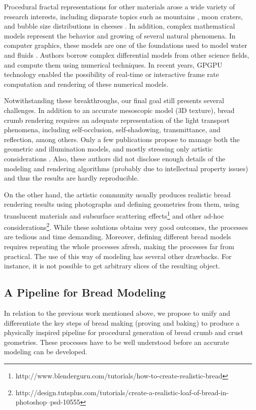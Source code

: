 Procedural fractal representations for other materials arose a wide variety of research interests, including disparate topics such as mountains \cite{Prusinkiewicz1993}, moon craters, and bubble size distributions in cheeses \cite{Mandelbrot1982}. 
In addition, complex mathematical models represent the behavior and growing of several natural phenomena. 
In computer graphics, these models are one of the foundations used to model water and fluids \cite{Stam1999,Fedkiw2001}. 
Authors borrow complex differential models from other science fields, and compute them using numerical techniques. 
In recent years, GPGPU technology \cite{Owens2007} enabled the possibility of real-time or interactive frame rate computation and rendering of these numerical models.

Notwithstanding these breakthroughs, our final goal still presents several challenges. 
In addition to an accurate mesoscopic model (3D texture), bread crumb rendering requires an adequate representation of the light transport phenomena, including self-occlusion, self-shadowing, transmittance, and reflection, among others.
Only a few publications propose to manage both the geometric and illumination models, and mostly stressing only artistic considerations \cite{Xenakis2007}.  Also, these authors did not disclose enough details of the modeling and rendering algorithms (probably due to intellectual property issues) and thus the results are hardly reproducible.

On the other hand, the artistic community usually produces realistic bread rendering results using photographs and defining geometries from them, using translucent materials and subsurface scattering effects\footnote{http://www.blenderguru.com/tutorials/how-to-create-realistic-bread} and other ad-hoc considerations\footnote{http://design.tutsplus.com/tutorials/create-a-realistic-loaf-of-bread-in-photoshop--psd-10555}. 
While these solutions obtains very good outcomes, the processes are tedious and time demanding. 
Moreover, defining different bread models requires repeating the whole processes afresh, making the processes far from practical. 
The use of this way of modeling has several other drawbacks. 
For instance, it is not possible to get arbitrary slices of the resulting object.


\subsection{A Pipeline for Bread Modeling}
In relation to the previous work mentioned above, we propose to unify and differentiate the key steps of bread making (proving and baking) to produce a physically inspired pipeline for procedural generation of bread crumb and crust geometries.
These processes have to be well understood before an accurate modeling can be developed.

